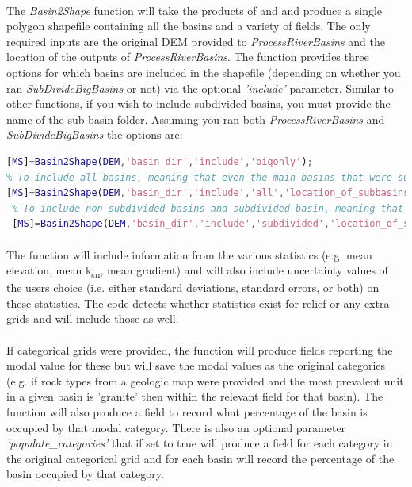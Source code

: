 \paragraph{}The \textit{Basin2Shape} function will take the products of  and  and produce a single polygon shapefile containing all the basins and a variety of fields. The only required inputs are the original DEM provided to \textit{ProcessRiverBasins} and the location of the outputs of \textit{ProcessRiverBasins}. The function provides three options for which basins are included in the shapefile (depending on whether you ran \textit{SubDivideBigBasins} or not) via the optional \textit{'include'} parameter. Similar to other functions, if you wish to include subdivided basins, you must provide the name of the sub-basin folder. Assuming you ran both \textit{ProcessRiverBasins} and \textit{SubDivideBigBasins} the options are:

\begin{lstlisting}[language=Matlab]
% To include only the original products of ProcessRiverBasins
[MS]=Basin2Shape(DEM,'basin_dir','include','bigonly');
% To include all basins, meaning that even the main basins that were subdivided will be inlcuded
[MS]=Basin2Shape(DEM,'basin_dir','include','all','location_of_subbasins','my_sub_basins');
 % To include non-subdivided basins and subdivided basin, meaning that main basins that were subdivided will  NOT be included
 [MS]=Basin2Shape(DEM,'basin_dir','include','subdivided','location_of_subbasins','my_sub_basins');
\end{lstlisting}

\paragraph{}The function will include information from the various statistics (e.g. mean elevation, mean k\textsubscript{sn}, mean gradient) and will also include uncertainty values of the users choice (i.e. either standard deviations, standard errors, or both) on these statistics. The code detects whether statistics exist for relief or any extra grids and will include those as well. 

\paragraph{}If categorical grids were provided, the function will produce fields reporting the modal value for these but will save the modal values as the original categories (e.g. if rock types from a geologic map were provided and the most prevalent unit in a given basin is 'granite' then within the relevant field for that basin). The function will also produce a field to record what percentage of the basin is occupied by that modal category. There is also an optional parameter \textit{'populate\_categories'} that if set to true will produce a field for each category in the original categorical grid and for each basin will record the percentage of the basin occupied by that category.

